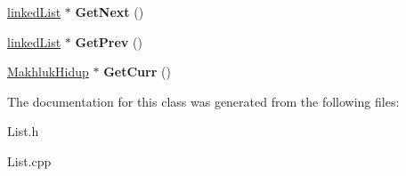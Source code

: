 \begin{DoxyCompactItemize}
\item 
\hyperlink{classlinked_list}{linked\+List} $\ast$ {\bfseries Get\+Next} ()\hypertarget{classlinked_list_a75213b3c1e4bf71a8fe7c6fb1aeb2d9c}{}\label{classlinked_list_a75213b3c1e4bf71a8fe7c6fb1aeb2d9c}

\item 
\hyperlink{classlinked_list}{linked\+List} $\ast$ {\bfseries Get\+Prev} ()\hypertarget{classlinked_list_aca4819988d60a89c6f61132ca9997a63}{}\label{classlinked_list_aca4819988d60a89c6f61132ca9997a63}

\item 
\hyperlink{class_makhluk_hidup}{Makhluk\+Hidup} $\ast$ {\bfseries Get\+Curr} ()\hypertarget{classlinked_list_a979e7bc9816fda56541832eb5f3be4f5}{}\label{classlinked_list_a979e7bc9816fda56541832eb5f3be4f5}

\end{DoxyCompactItemize}


The documentation for this class was generated from the following files\+:\begin{DoxyCompactItemize}
\item 
List.\+h\item 
List.\+cpp\end{DoxyCompactItemize}
